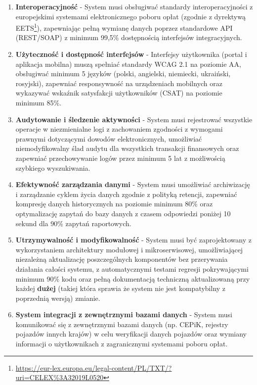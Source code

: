 \documentclass[12pt]{article}
\begin{document}
\begin{enumerate}
    \item \textbf{Interoperacyjność} - System musi obsługiwać standardy interoperacyjności z europejskimi systemami elektronicznego poboru opłat (zgodnie z dyrektywą EETS\footnote{\url{https://eur-lex.europa.eu/legal-content/PL/TXT/?uri=CELEX\%3A32019L0520}}), zapewniając pełną wymianę danych poprzez standardowe API (REST/SOAP) z minimum 99,5\% dostępnością interfejsów integracyjnych.

    \item \textbf{Użyteczność i dostępność interfejsów} - Interfejsy użytkownika (portal i aplikacja mobilna) muszą spełniać standardy WCAG 2.1 na poziomie AA, obsługiwać minimum 5 języków (polski, angielski, niemiecki, ukraiński, rosyjski), zapewniać responsywność na urządzeniach mobilnych oraz wykazywać wskaźnik satysfakcji użytkowników (CSAT) na poziomie minimum 85\%.

    \item \textbf{Audytowanie i śledzenie aktywności} - System musi rejestrować wszystkie operacje w niezmienialne logi z zachowaniem zgodności z wymogami prawnymi dotyczącymi dowodów elektronicznych, umożliwiać niemodyfikowalny ślad audytu dla wszystkich transakcji finansowych oraz zapewniać przechowywanie logów przez minimum 5 lat z możliwością szybkiego wyszukiwania.

    \item \textbf{Efektywność zarządzania danymi} - System musi umożliwiać archiwizację i zarządzanie cyklem życia danych zgodnie z polityką retencji, zapewniać kompresję danych historycznych na poziomie minimum 80\% oraz optymalizację zapytań do bazy danych z czasem odpowiedzi poniżej 10 sekund dla 90\% zapytań raportowych.

    \item \textbf{Utrzymywalność i modyfikowalność} - System musi być zaprojektowany z wykorzystaniem architektury modułowej i mikroserwisowej, umożliwiającej niezależną aktualizację poszczególnych komponentów bez przerywania działania całości systemu, z automatycznymi testami regresji pokrywającymi minimum 90\% kodu oraz pełną dokumentacją techniczną aktualizowaną przy każdej \textbf{dużej} (takiej która sprawia że system nie jest kompatybilny z poprzednią wersją) zmianie.

    \item \textbf{System integracji z zewnętrznymi bazami danych} - System musi komunikować się z zewnętrznymi bazami danych (np. CEPiK, rejestry pojazdów innych krajów) w celu weryfikacji danych pojazdów oraz wymiany informacji o użytkownikach z zagranicznymi systemami poboru opłat.


\end{enumerate}
\end{document}
